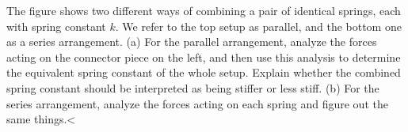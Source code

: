 The figure shows two different ways of combining a
pair of identical springs, each with spring constant $k$. We
refer to the top setup as parallel, and the bottom one as a
series arrangement.\hwendpart
 (a) For the parallel arrangement,
analyze the forces acting on the connector piece on the
left, and then use this analysis to determine the equivalent
spring constant of the whole setup. Explain whether the
combined spring constant should be interpreted as being
stiffer or less stiff.\hwendpart
 (b) For the series arrangement,
analyze the forces acting on each spring and figure
out the same things.<%
